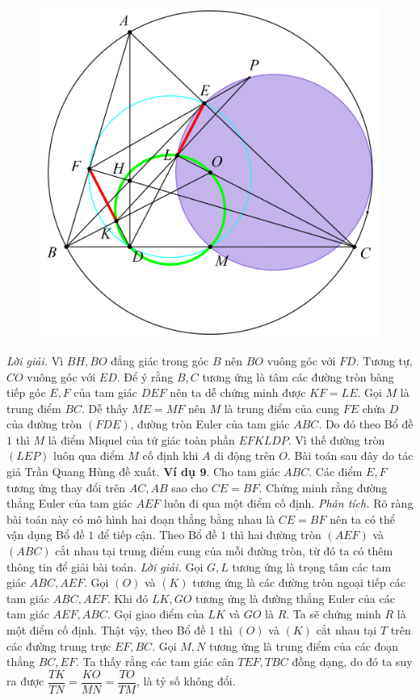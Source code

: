 \begin{multicols}{2}
\begin{figure}[H]
		\includegraphics[width= 1\linewidth]{16}
		\vspace*{-10pt}
	\end{figure}
	\textit{Lời giải.} Vì $BH, BO$ đẳng giác trong góc $B$ nên $BO$ vuông góc với $FD$. Tương tự, $CO$ vuông góc với $ED$. Để ý rằng $B,C$ tương ứng là tâm các đường tròn bàng tiếp góc $E,F$ của tam giác $DEF$ nên ta dễ chứng minh được $KF=LE$. Gọi $M$ là trung điểm $BC$. Dễ thấy $ME=MF$ nên $M$ là trung điểm của cung $FE$ chứa $D$ của đường tròn $(FDE)$, đường tròn Euler của tam giác $ABC$. Do đó theo Bổ đề $1$ thì $M$ là điểm Miquel của tứ giác toàn phần $EFKLDP$. Vì thế đường tròn $(LEP)$ luôn qua điểm $M$ cố định khi $A$ di động trên $O$.
	\vskip 0.1cm
	Bài toán sau đây do tác giả Trần Quang Hùng đề xuất.
	\vskip 0.1cm
	\textbf{\color{hoccungpi}Ví dụ $\pmb{9.}$} Cho tam giác $ABC$. Các điểm $E,F$ tương ứng thay đổi trên $AC,AB$ sao cho $CE=BF$. Chứng minh rằng đường thẳng Euler của tam giác $AEF$ luôn đi qua một điểm cố định.
	\vskip 0.1cm
	\textit{Phân tích.} Rõ ràng bài toán này có mô hình hai đoạn thẳng bằng nhau là $CE=BF$ nên ta có thể vận dụng Bổ đề $1$ để tiếp cận. Theo Bổ đề $1$ thì hai đường tròn $(AEF)$ và $(ABC)$ cắt nhau tại trung điểm cung của mỗi đường tròn, từ đó ta có thêm thông tin để giải bài toán.
	\vskip 0.1cm
	\textit{Lời giải.} Gọi $ G,L$ tương ứng là trọng tâm các tam giác $ABC,AEF$. Gọi $(O)$ và $(K)$ tương ứng là các đường tròn ngoại tiếp các tam giác $ABC, AEF$. Khi đó $LK,GO$ tương ứng là đường thẳng Euler của các tam giác $AEF,ABC$. Gọi giao điểm của $LK$ và $ GO$ là $R$. Ta sẽ chứng minh $R$ là một điểm cố định. Thật vậy, theo Bổ đề $1$ thì $(O)$ và $(K)$ cắt nhau tại $T$ trên các đường trung trực $EF,BC$. Gọi $ M,N$ tương ứng là trung điểm của các đoạn thẳng $BC,EF$. Ta thấy rằng các tam giác cân $TEF,TBC$ đồng dạng, do đó ta suy ra được $\dfrac{TK}{TN} = \dfrac{KO}{MN} = \dfrac{TO}{TM}$, là tỷ số không đổi.

\end{multicols}
